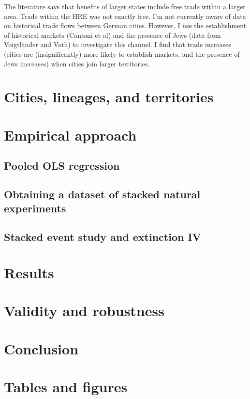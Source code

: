\documentclass{article}
\begin{document}
The literature says that benefits of larger states include free trade within a larger area. Trade within the HRE was not exactly free. I'm not currently aware of data on historical trade flows between German cities. However, I use the establishment of historical markets (Cantoni et al) and the presence of Jews (data from Voigtl\"ander and Voth) to investigate this channel. I find that trade increases (cities are (insignificantly) more likely to establish markets, and the presence of Jews increases) when cities join larger territories.

\section{Cities, lineages, and territories}

\section{Empirical approach}

\subsection{Pooled OLS regression}

\subsection{Obtaining a dataset of stacked natural experiments}

\subsection{Stacked event study and extinction IV}

\section{Results}

\section{Validity and robustness}

\section{Conclusion}



\newpage



\newpage
\section*{Tables and figures}
\end{document}
